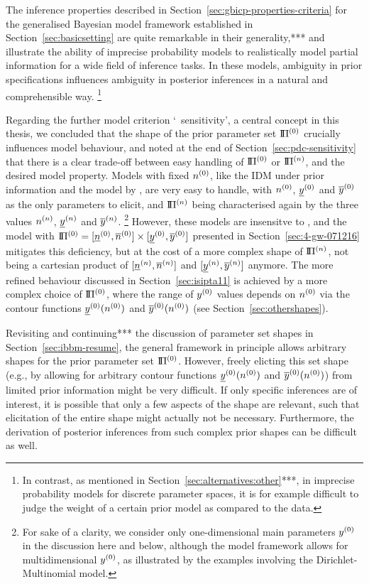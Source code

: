 The inference properties described in Section~\ref{sec:gbicp-properties-criteria}
for the generalised Bayesian model framework established in Section~\ref{sec:basicsetting}
are quite remarkable in their generality,***
and illustrate the ability of imprecise probability models to realistically model partial information
for a wide field of inference tasks.
In these models, ambiguity in prior specifications influences ambiguity in posterior inferences
in a natural and comprehensible way.%
\footnote{In contrast, as mentioned in Section~\ref{sec:alternatives:other}***,
in imprecise probability models for discrete parameter spaces,
it is for example difficult to judge the weight of a certain prior model as compared to the data.}

Regarding the further model criterion `\pdc\ sensitivity',
a central concept in this thesis,
we concluded that the shape of the prior parameter set $\text{I}\!\Pi^{(0)}$
crucially influences model behaviour, 
and noted at the end of Section~\ref{sec:pdc-sensitivity} that
there is a clear trade-off between easy handling of $\text{I}\!\Pi^{(0)}$ or $\text{I}\!\Pi^{(n)}$, and the desired model property.
Models with fixed $n^{(0)}$, like the IDM under prior information and the model by \textcite{2005:quaeghebeurcooman},
are very easy to handle, with $n^{(0)}$, $\underline{y}^{(0)}$ and $\overline{y}^{(0)}$ as the only parameters to elicit,
and $\text{I}\!\Pi^{(n)}$ being characterised again by the three values $n^{(n)}$, $\underline{y}^{(n)}$ and $\overline{y}^{(n)}$.%
\footnote{For sake of a clarity,
we consider only one-dimensional main parameters $y^{(0)}$ in the discussion here and below,
although the model framework allows for multidimensional $y^{(0)}$,
as illustrated by the examples involving the Dirichlet-Multinomial model.}
However, these models are insensitve to \pdc,
and the model with $\text{I}\!\Pi^{(0)} = [\underline{n}^{(0)}, \overline{n}^{(0)}] \times [\underline{y}^{(0)}, \overline{y}^{(0)}]$
presented in Section~\ref{sec:4-gw-071216}
mitigates this deficiency, but at the cost of a more complex shape of $\text{I}\!\Pi^{(n)}$,
not being a cartesian product of $[\underline{n}^{(n)}, \overline{n}^{(n)}]$ and $[\underline{y}^{(n)}, \overline{y}^{(n)}]$ anymore.
The more refined behaviour discussed in Section~\ref{sec:isipta11}
is achieved by a more complex choice of $\text{I}\!\Pi^{(0)}$,
where the range of $y^{(0)}$ values depends on $n^{(0)}$
via the contour functions $\underline{y}^{(0)}(n^{(0)})$ and $\overline{y}^{(0)}(n^{(0)})$
(see Section~\ref{sec:othershapes}).

Revisiting and continuing*** the discussion of parameter set shapes in Section~\ref{sec:ibbm-resume},
the general framework in principle allows arbitrary shapes for the prior parameter set $\text{I}\!\Pi^{(0)}$.
However, freely elicting this set shape
(e.g., by allowing for arbitrary contour functions $\underline{y}^{(0)}(n^{(0)})$ and $\overline{y}^{(0)}(n^{(0)})$)
from limited prior information might be very difficult.
If only specific inferences are of interest,
it is possible that only a few aspects of the shape are relevant,
such that elicitation of the entire shape might actually not be necessary.
Furthermore, the derivation of posterior inferences from
such complex prior shapes can be difficult as well.

